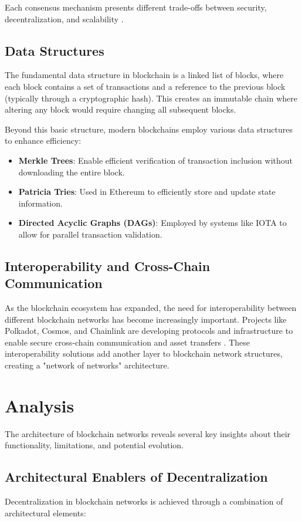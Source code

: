 \documentclass[twoside]{article}
\begin{document}
Each consensus mechanism presents different trade-offs between security, decentralization, and scalability \cite{reasearchgate}.

\subsection{Data Structures}
The fundamental data structure in blockchain is a linked list of blocks, where each block contains a set of transactions and a reference to the previous block (typically through a cryptographic hash). This creates an immutable chain where altering any block would require changing all subsequent blocks.

Beyond this basic structure, modern blockchains employ various data structures to enhance efficiency:
\begin{itemize}
  \item \textbf{Merkle Trees}: Enable efficient verification of transaction inclusion without downloading the entire block.
  \item \textbf{Patricia Tries}: Used in Ethereum to efficiently store and update state information.
  \item \textbf{Directed Acyclic Graphs (DAGs)}: Employed by systems like IOTA to allow for parallel transaction validation.
\end{itemize}

\subsection{Interoperability and Cross-Chain Communication}
As the blockchain ecosystem has expanded, the need for interoperability between different blockchain networks has become increasingly important. Projects like Polkadot, Cosmos, and Chainlink are developing protocols and infrastructure to enable secure cross-chain communication and asset transfers \cite{doi}. These interoperability solutions add another layer to blockchain network structures, creating a "network of networks" architecture.

\section{Analysis} 
The architecture of blockchain networks reveals several key insights about their functionality, limitations, and potential evolution.

\subsection{Architectural Enablers of Decentralization}
Decentralization in blockchain networks is achieved through a combination of architectural elements:
\end{document}
